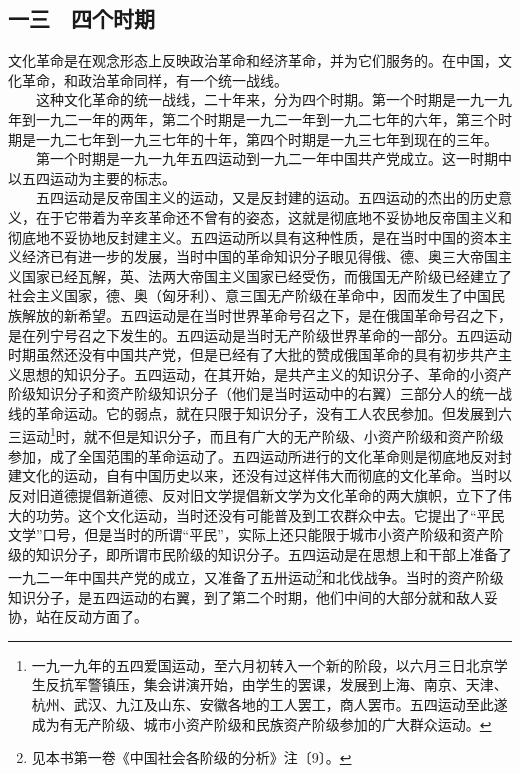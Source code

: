 \documentclass[cn,11pt,chinese]{elegantbook}
\def\myformat#1{\hfil\hfil #1}
\begin{document}
\subsection*{\myformat{一三　四个时期}}
文化革命是在观念形态上反映政治革命和经济革命，并为它们服务的。在中国，文化革命，和政治革命同样，有一个统一战线。\\
　　这种文化革命的统一战线，二十年来，分为四个时期。第一个时期是一九一九年到一九二一年的两年，第二个时期是一九二一年到一九二七年的六年，第三个时期是一九二七年到一九三七年的十年，第四个时期是一九三七年到现在的三年。\\
　　第一个时期是一九一九年五四运动到一九二一年中国共产党成立。这一时期中以五四运动为主要的标志。\\
　　五四运动是反帝国主义的运动，又是反封建的运动。五四运动的杰出的历史意义，在于它带着为辛亥革命还不曾有的姿态，这就是彻底地不妥协地反帝国主义和彻底地不妥协地反封建主义。五四运动所以具有这种性质，是在当时中国的资本主义经济已有进一步的发展，当时中国的革命知识分子眼见得俄、德、奥三大帝国主义国家已经瓦解，英、法两大帝国主义国家已经受伤，而俄国无产阶级已经建立了社会主义国家，德、奥（匈牙利）、意三国无产阶级在革命中，因而发生了中国民族解放的新希望。五四运动是在当时世界革命号召之下，是在俄国革命号召之下，是在列宁号召之下发生的。五四运动是当时无产阶级世界革命的一部分。五四运动时期虽然还没有中国共产党，但是已经有了大批的赞成俄国革命的具有初步共产主义思想的知识分子。五四运动，在其开始，是共产主义的知识分子、革命的小资产阶级知识分子和资产阶级知识分子（他们是当时运动中的右翼）三部分人的统一战线的革命运动。它的弱点，就在只限于知识分子，没有工人农民参加。但发展到六三运动\footnote[28]{ 一九一九年的五四爱国运动，至六月初转入一个新的阶段，以六月三日北京学生反抗军警镇压，集会讲演开始，由学生的罢课，发展到上海、南京、天津、杭州、武汉、九江及山东、安徽各地的工人罢工，商人罢市。五四运动至此遂成为有无产阶级、城市小资产阶级和民族资产阶级参加的广大群众运动。}时，就不但是知识分子，而且有广大的无产阶级、小资产阶级和资产阶级参加，成了全国范围的革命运动了。五四运动所进行的文化革命则是彻底地反对封建文化的运动，自有中国历史以来，还没有过这样伟大而彻底的文化革命。当时以反对旧道德提倡新道德、反对旧文学提倡新文学为文化革命的两大旗帜，立下了伟大的功劳。这个文化运动，当时还没有可能普及到工农群众中去。它提出了“平民文学”口号，但是当时的所谓“平民”，实际上还只能限于城市小资产阶级和资产阶级的知识分子，即所谓市民阶级的知识分子。五四运动是在思想上和干部上准备了一九二一年中国共产党的成立，又准备了五卅运动\footnote[29]{ 见本书第一卷《中国社会各阶级的分析》注〔9〕。}和北伐战争。当时的资产阶级知识分子，是五四运动的右翼，到了第二个时期，他们中间的大部分就和敌人妥协，站在反动方面了。\\
\end{document}
